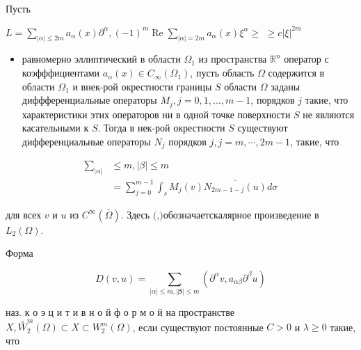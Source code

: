 \documentclass[10pt]{article}
\begin{document}
Пусть



$L=\sum_{|\alpha| \leqslant 2 m} a_{\alpha}(x) \partial^{\alpha},(-1)^{m} \operatorname{Re} \sum_{|\alpha|=2 m} a_{\alpha}(x) \xi^{\alpha} \geqslant$ $\geqslant c|\xi|^{2 m}$



\begin{itemize}

  \item равномерно эллиптический в области $\Omega_{1}$ из пространства $\mathbb{R}^{n}$ оператор с коэфффициентами $a_{\alpha}(x) \in C_{\infty}\left(\Omega_{1}\right)$, пусть область $\Omega$ содержится в области $\Omega_{1}$ и внек-рой окрестности границы $S$ области $\Omega$ заданы диффференциальные операторы $M_{j}, j=0,1, \ldots, m-1$, порядков $j$ такие, что характеристики этих операторов ни в одной точке поверхности $S$ не являются касательными к $S$. Тогда в нек-рой окрестности $S$ существуют дифференциальные операторы $N_{j}$ порядков $j, j=m, \cdots, 2 m-1$, такие, что

\end{itemize}



\[

\begin{aligned}

\sum_{|\alpha|} & \leqslant m,|\beta| \leqslant m \\

& =\sum_{j=0}^{m-1} \int_{s} M_{j}(v) \overline{N_{2 m-1-j}(u)} d \sigma

\end{aligned}

\]



для всех $v$ и $u$ из $C^{\infty}(\bar{\Omega})$. Здесь $($,$) обозначает скалярное$ произведение в $L_{2}(\Omega)$.



Форма



\[

D(v, u)=\sum_{|\alpha| \leqslant m,|\boldsymbol{\beta}| \leqslant m}\left(\partial^{\alpha} v, a_{\alpha \beta} \partial^{\beta} u\right)

\]



наз. к о э ц и т и в н о й ф о р м о й на пространстве $X, \stackrel{\circ}{W}_{2}^{m}(\Omega) \subset X \subset W_{2}^{m}(\Omega)$, если существуют постоянные $C>0$ и $\lambda \geqslant 0$ такие, что
\end{document}
